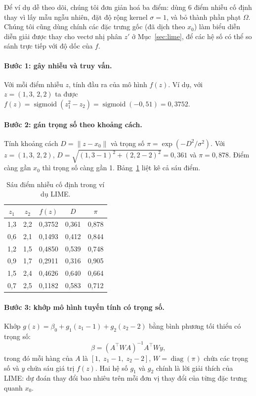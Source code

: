 \documentclass[11pt,a4paper]{article}
\begin{document}
Để ví dụ dễ theo dõi, chúng tôi đơn giản hoá ba điểm: dùng 6 điểm nhiễu cố
định thay vì lấy mẫu ngẫu nhiên, đặt độ rộng kernel $\sigma = 1$, và bỏ thành
phần phạt $\Omega$. Chúng tôi cũng dùng chính các đặc trưng gốc (đã dịch theo
$x_0$) làm biểu diễn diễn giải được thay cho vectơ nhị phân $z'$ ở
Mục~\ref{sec:lime}, để các hệ số có thể so sánh trực tiếp với độ dốc của $f$.

\paragraph{Bước 1: gây nhiễu và truy vấn.} Với mỗi điểm nhiễu $z$, tính đầu
ra của mô hình $f(z)$. Ví dụ, với $z = (1{,}3,\, 2{,}2)$ ta được
$f(z) = \operatorname{sigmoid}(z_1^2 - z_2) = \operatorname{sigmoid}(-0{,}51) = 0{,}3752$.

\paragraph{Bước 2: gán trọng số theo khoảng cách.} Tính khoảng cách
$D = \lVert z - x_0 \rVert$ và trọng số $\pi = \exp(-D^2/\sigma^2)$. Với
$z = (1{,}3,\, 2{,}2)$, $D = \sqrt{(1{,}3 - 1)^2 + (2{,}2 - 2)^2} = 0{,}361$
và $\pi = 0{,}878$. Điểm càng gần $x_0$ thì trọng số càng gần 1.
Bảng~\ref{tab:limepoints} liệt kê cả sáu điểm.

\begin{table}[!htb]
\centering\small
\caption{Sáu điểm nhiễu cố định trong ví dụ LIME.}\label{tab:limepoints}
\begin{tabular}{ccccc}
\toprule
$z_1$ & $z_2$ & $f(z)$ & $D$ & $\pi$\\
\midrule
1,3 & 2,2 & 0,3752 & 0,361 & 0,878\\
0,6 & 2,1 & 0,1493 & 0,412 & 0,844\\
1,2 & 1,5 & 0,4850 & 0,539 & 0,748\\
0,9 & 1,7 & 0,2911 & 0,316 & 0,905\\
1,5 & 2,4 & 0,4626 & 0,640 & 0,664\\
0,7 & 2,5 & 0,1182 & 0,583 & 0,712\\
\bottomrule
\end{tabular}
\end{table}

\paragraph{Bước 3: khớp mô hình tuyến tính có trọng số.} Khớp
$g(z) = \beta_0 + g_1 (z_1 - 1) + g_2 (z_2 - 2)$ bằng bình phương tối thiểu
có trọng số:
\begin{equation}
\beta = (A^\top W A)^{-1} A^\top W y,
\end{equation}
trong đó mỗi hàng của $A$ là $[1,\; z_1 - 1,\; z_2 - 2]$,
$W = \operatorname{diag}(\pi)$ chứa các trọng số và $y$ chứa sáu giá trị
$f(z)$. Hai hệ số $g_1$ và $g_2$ chính là lời giải thích của LIME: dự đoán
thay đổi bao nhiêu trên mỗi đơn vị thay đổi của từng đặc trưng quanh $x_0$.
\end{document}
